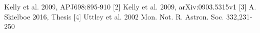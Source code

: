 \documentclass[11pt]{article}
\begin{document}
\newpage
[1] Kelly et al. 2009, APJ698:895-910 
[2] Kelly et al. 2009, arXiv:0903.5315v1 
[3] A. Skielboe 2016, Thesis 
[4] Uttley et al. 2002 Mon. Not. R. Astron. Soc. 332,231-250

\end{document}
